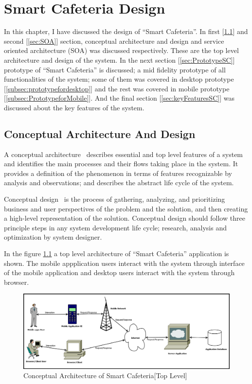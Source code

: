 \chapter{Smart Cafeteria Design}
\label{chap:DesignofSmartCafeteria}
In this chapter, I have discussed the design of ``Smart Cafeteria''. In first
[\ref{sec:CAD}] and second [\ref{sec:SOA}] section, conceptual architecture and
design and service oriented architecture (SOA) was discussed respectively. These
are the top level architecture and design of the system. In the next section
[\ref{sec:PrototypeSC}] prototype of ``Smart Cafeteria'' is discussed; a mid
fidelity prototype of all functionalities of the system; some of them was
covered in desktop prototype [\ref{subsec:prototypefordesktop}] and the rest was
covered in mobile prototype [\ref{subsec:PrototypeforMobile}]. And the final
section [\ref{sec:keyFeaturesSC}] was discussed about the key features of the
system.

\section{Conceptual Architecture And Design}
\label{sec:CAD}
A conceptual architecture~\cite{Zamg} describes essential and top level features
of a system and identifies the main processes and their flows taking place in
the system. It provides a definition of the phenomenon in terms of features
recognizable by analysis and observations; and describes the abstract life cycle
of the system.

Conceptual design~\cite{MicrosoftCorporation2003} is the process of gathering,
analyzing, and prioritizing business and user perspectives of the problem and
the solution, and then creating a high-level representation of the solution.
Conceptual design should follow three principle steps in any system
development life cycle; research, analysis and optimization by system designer.


In the figure \ref{ConceptualArchitecture_top_level} a top level architecture of
``Smart Cafeteria'' application is shown.
The mobile appplication users interact with the system through interface of the
mobile application and desktop users interact with the system through browser.
\begin{figure}[h!t]
    \centering
      \includegraphics[width=5.5in]{ch4/SOA/ConceptualArchitecture}
  \caption{Conceptual Architecture of Smart Cafeteria[Top Level]}
  \label{ConceptualArchitecture_top_level}
\end{figure}

